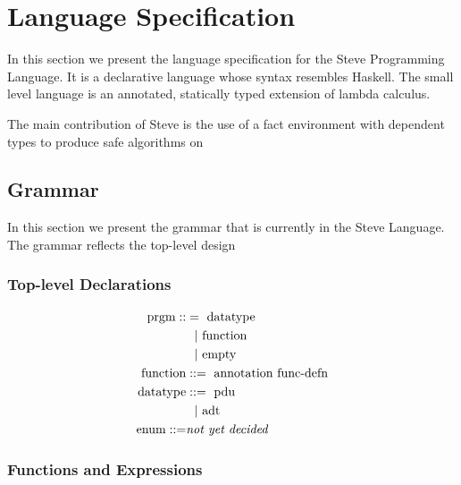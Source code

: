 \newcommand{\pn}[1]{ \textnormal{#1} }
\newcommand{\oo}{\; \mid \;}
\newcommand{\nb}{~~~|~}
\newcommand{\sk}{\dots }
\newcommand{\ww}{\;}
\newcommand{\nn}{\perp}
\newcommand{\sm}[1]{\textnormal{#1}}
\newcommand{\sd}[1]{\textnormal{\it #1}}


\section{Language Specification}
In this section we present the language specification for the Steve Programming
Language. It is a declarative language whose syntax resembles Haskell. The
small level language is an annotated, statically typed extension of lambda
calculus.

The main contribution of Steve is the use of a fact environment with dependent
types to produce safe algorithms on 

\subsection{Grammar}
In this section we present the grammar that is currently in the Steve Language.
The grammar reflects the top-level design

\subsubsection{Top-level Declarations}

\begin{align*}
  \pn{prgm} ::&=~ \pn{datatype} \\
         &~~|~ \pn{function} \\
         &~~|~ \pn{empty} \\
  \pn{function} &::=~ \pn{annotation} ~ \pn{func-defn} \\
  \pn{datatype} &::=~ \pn{pdu} \\
             &~~|~ \pn{adt} \\
  \pn{enum} ::=& \pn{\emph{not yet decided}}
\end{align*}

\subsubsection{Functions and Expressions}


